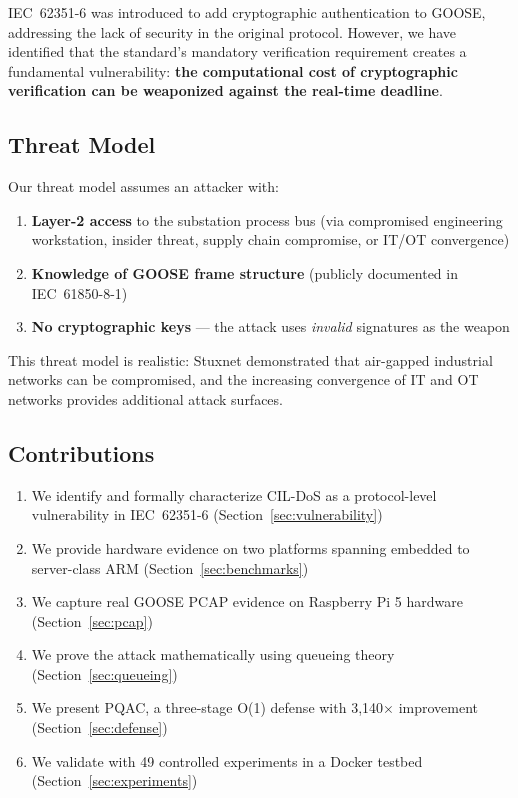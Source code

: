 \documentclass[11pt,a4paper]{article}
\begin{document}
IEC~62351-6 was introduced to add cryptographic authentication to GOOSE, addressing the lack of security in the original protocol. However, we have identified that the standard's mandatory verification requirement creates a fundamental vulnerability: \textbf{the computational cost of cryptographic verification can be weaponized against the real-time deadline}.

\subsection{Threat Model}

Our threat model assumes an attacker with:
\begin{enumerate}[leftmargin=2em]
    \item \textbf{Layer-2 access} to the substation process bus (via compromised engineering workstation, insider threat, supply chain compromise, or IT/OT convergence)
    \item \textbf{Knowledge of GOOSE frame structure} (publicly documented in IEC~61850-8-1)
    \item \textbf{No cryptographic keys} --- the attack uses \emph{invalid} signatures as the weapon
\end{enumerate}

This threat model is realistic: Stuxnet demonstrated that air-gapped industrial networks can be compromised, and the increasing convergence of IT and OT networks provides additional attack surfaces.

\subsection{Contributions}

\begin{enumerate}[leftmargin=2em]
    \item We identify and formally characterize CIL-DoS as a protocol-level vulnerability in IEC~62351-6 (Section~\ref{sec:vulnerability})
    \item We provide hardware evidence on two platforms spanning embedded to server-class ARM (Section~\ref{sec:benchmarks})
    \item We capture real GOOSE PCAP evidence on Raspberry Pi 5 hardware (Section~\ref{sec:pcap})
    \item We prove the attack mathematically using queueing theory (Section~\ref{sec:queueing})
    \item We present PQAC, a three-stage O(1) defense with 3{,}140$\times$ improvement (Section~\ref{sec:defense})
    \item We validate with 49 controlled experiments in a Docker testbed (Section~\ref{sec:experiments})
\end{enumerate}
\end{document}
